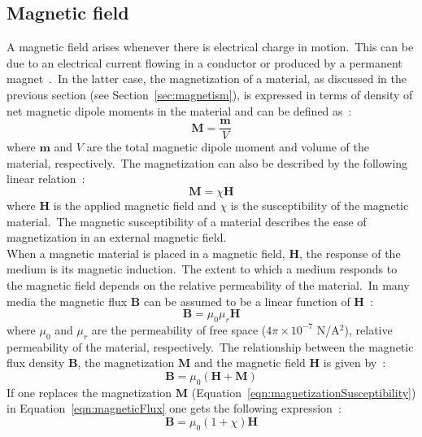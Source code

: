 \subsection{Magnetic field}\label{subsec:magneticField}
A magnetic field arises whenever there is electrical charge in motion.\ This can be due to an electrical current flowing in a conductor or produced by a permanent magnet~\cite{Oersted1820,Skomski2008}.\ In the latter case, the magnetization of a material, as discussed in the previous section (see Section~\ref{sec:magnetism}), is expressed in terms of density of net magnetic dipole moments in the material and can be defined as~\cite{Skomski2008}:\
\begin{equation}
	\mathbf{M} = \frac{\mathbf{m}}{V}
	\label{eqn:magnetization}
\end{equation}
where $\mathbf{m}$ and $V$ are the total magnetic dipole moment and volume of the material, respectively.\ The magnetization can also be described by the following linear relation~\cite{Skomski2008}:
\begin{equation}
	\mathbf{M} = \chi \mathbf{H}
	\label{eqn:magnetizationSusceptibility}
\end{equation}
where $\mathbf{H}$ is the applied magnetic field and $\chi$ is the susceptibility of the magnetic material.\ The magnetic susceptibility of a material describes the ease of magnetization in an external magnetic field.\\
When a magnetic material is placed in a magnetic field, $\mathbf{H}$, the response of the medium is its magnetic induction.\ The extent to which a medium responds to the magnetic field depends on the relative permeability of the material.\ In many media the magnetic flux $\mathbf{B}$ can be assumed to be a linear function of $\mathbf{H}$~\cite{Skomski2008}:\
\begin{equation}
	\mathbf{B} = \mu_{0}\mu_{r}\mathbf{H}
	\label{eqn:magneticFluxPermeability}
\end{equation}
where $\mu_{0}$ and $\mu_{r}$ are the permeability of free space ($4\pi \times 10^{-7}$ N/A$^{2}$), relative permeability of the material, respectively.\ The relationship between the magnetic flux density $\mathbf{B}$, the magnetization $\mathbf{M}$ and the magnetic field $\mathbf{H}$  is given by~\cite{Skomski2008}:\
\begin{equation}
	\mathbf{B} = \mu_{0}(\mathbf{H} + \mathbf{M})
	\label{eqn:magneticFlux}
\end{equation}
If one replaces the magnetization $\mathbf{M}$ (Equation~\ref{eqn:magnetizationSusceptibility}) in Equation~\ref{eqn:magneticFlux} one gets the following expression~\cite{Skomski2008}:\
\begin{equation}
	\mathbf{B} = \mu_{0}(1 + \chi)\mathbf{H}
	\label{eqn:magneticFluxSusceptibility}
\end{equation}
%
